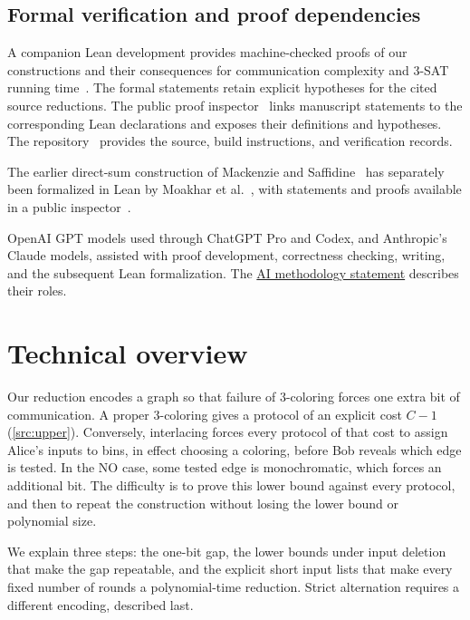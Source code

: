 \documentclass[11pt,letterpaper]{article} \usepackage[utf8]{inputenc}
\theoremstyle{plain} \newtheorem{theorem}{Theorem}[section]
\theoremstyle{definition} \newaliascnt{definition}{theorem}
\begin{document}
\subsection{Formal verification and proof dependencies}
\label{sec:formal-verification}

A companion Lean development provides machine-checked proofs of our
constructions and their consequences for communication complexity and
$3$-SAT running time~\cite{interlacing2026lean}. The formal statements
retain explicit hypotheses for the cited source reductions.
The public proof inspector~\cite{interlacing2026inspector} links manuscript
statements to the corresponding Lean declarations and exposes their
definitions and hypotheses. The repository~\cite{interlacing2026lean}
provides the source, build instructions, and verification records.

The earlier direct-sum construction of Mackenzie and
Saffidine~\cite{mackenzie2025refuting} has separately been formalized in
Lean by Moakhar et al.~\cite{moakhar2026beyond}, with statements and proofs available in
a public inspector~\cite{beyondlibrary2026inspector}.

OpenAI GPT models used through ChatGPT Pro and Codex, and Anthropic's
Claude models, assisted with proof development, correctness checking, writing,
and the subsequent Lean formalization. The
\hyperref[sec:ai-methodology]{AI methodology statement} describes their roles.

\clearpage
\section{Technical overview}
\label{sec:overview}

Our reduction encodes a graph so that failure of $3$-coloring forces one
extra bit of communication. A proper $3$-coloring gives a protocol of an
explicit cost $C-1$ (\cref{src:upper}). Conversely, interlacing forces every
protocol of that cost to assign Alice's inputs to bins, in effect choosing a
coloring, before Bob reveals which edge is tested. In the NO case, some tested
edge is monochromatic, which forces an additional bit. The difficulty is to
prove this lower bound against every protocol, and then to repeat the
construction without losing the lower bound or polynomial size.

We explain three steps: the one-bit gap, the lower bounds under input
deletion that make the gap repeatable, and the explicit short input lists
that make every fixed number of rounds a polynomial-time reduction.
Strict alternation requires a different encoding, described last.
\end{document}
